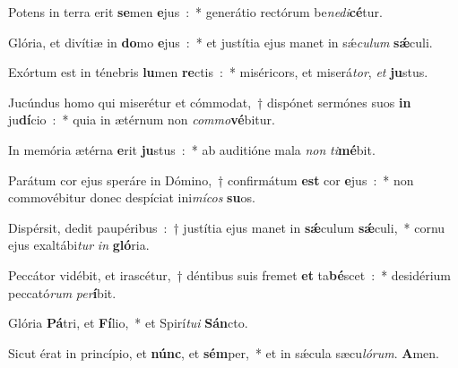﻿\item Potens in terra erit \textbf{se}men \textbf{e}jus~:~* generátio rectórum be\emph{ne}\emph{di}\textbf{cé}tur.
\item Glória, et divítiæ in \textbf{do}mo \textbf{e}jus~:~* et justítia ejus manet in sǽ\emph{cu}\emph{lum} \textbf{sǽ}culi.
\item Exórtum est in ténebris \textbf{lu}men \textbf{re}ctis~:~* miséricors, et miserá\emph{tor}, \emph{et} \textbf{ju}stus.
\item Jucúndus homo qui miserétur et cómmodat,~† dispónet sermónes suos \textbf{in} ju\textbf{dí}cio~:~* quia in ætérnum non \emph{com}\emph{mo}\textbf{vé}bitur.
\item In memória ætérna \textbf{e}rit \textbf{ju}stus~:~* ab auditióne mala \emph{non} \emph{ti}\textbf{mé}bit.
\item Parátum cor ejus speráre in Dómino,~† confirmátum \textbf{est} cor \textbf{e}jus~:~* non commovébitur donec despíciat ini\emph{mí}\emph{cos} \textbf{su}os.
\item Dispérsit, dedit paupéribus~:~† justítia ejus manet in \textbf{sǽ}culum \textbf{sǽ}culi,~* cornu ejus exaltábi\emph{tur} \emph{in} \textbf{gló}ria.
\item Peccátor vidébit, et irascétur,~† déntibus suis fremet \textbf{et} ta\textbf{bé}scet~:~* desidérium peccató\emph{rum} \emph{per}\textbf{í}bit.
\item Glória \textbf{Pá}tri, et \textbf{Fí}lio,~* et Spirí\emph{tu}\emph{i} \textbf{Sán}cto.
\item Sicut érat in princípio, et \textbf{núnc}, et \textbf{sém}per,~* et in sǽcula sæcu\emph{ló}\emph{rum}. \textbf{A}men.